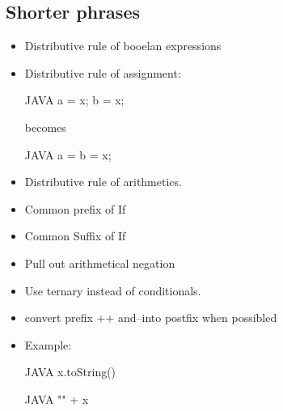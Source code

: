 \subsection{Shorter phrases}
\begin{itemize}
  \item Distributive rule of booelan expressions
  \item Distributive rule of assignment:
  \begin{code}{JAVA}
a = x;
b = x;
  \end{code}
  becomes
    \begin{code}{JAVA}
a = b = x;
  \end{code}
  \item Distributive rule of arithmetics.
  \item Common prefix of If
  \item Common Suffix of If
  \item Pull out arithmetical negation
  \item Use ternary instead of conditionals.
  \item convert prefix ++ and--into postfix when possibled
  \item Example:
\begin{code}{JAVA}
x.toString()
\end{code}
\begin{code}{JAVA}
"" + x
\end{code}
\end{itemize}

